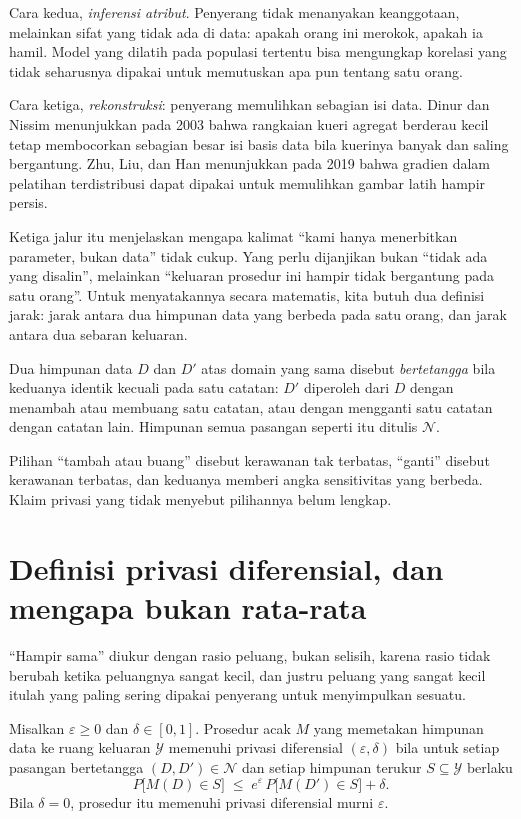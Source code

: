 Cara kedua, \emph{inferensi atribut}. Penyerang tidak menanyakan keanggotaan, melainkan
sifat yang tidak ada di data: apakah orang ini merokok, apakah ia hamil. Model yang
dilatih pada populasi tertentu bisa mengungkap korelasi yang tidak seharusnya dipakai
untuk memutuskan apa pun tentang satu orang.

Cara ketiga, \emph{rekonstruksi}: penyerang memulihkan sebagian isi data. Dinur dan
Nissim menunjukkan pada 2003 bahwa rangkaian kueri agregat berderau kecil tetap
membocorkan sebagian besar isi basis data bila kuerinya banyak dan saling bergantung.
Zhu, Liu, dan Han menunjukkan pada 2019 bahwa gradien dalam pelatihan terdistribusi
dapat dipakai untuk memulihkan gambar latih hampir persis.

Ketiga jalur itu menjelaskan mengapa kalimat ``kami hanya menerbitkan parameter, bukan
data'' tidak cukup. Yang perlu dijanjikan bukan ``tidak ada yang disalin'', melainkan
``keluaran prosedur ini hampir tidak bergantung pada satu orang''. Untuk menyatakannya
secara matematis, kita butuh dua definisi jarak: jarak antara dua himpunan data yang
berbeda pada satu orang, dan jarak antara dua sebaran keluaran.

\begin{definisi}
Dua himpunan data $D$ dan $D'$ atas domain yang sama disebut \emph{bertetangga} bila
keduanya identik kecuali pada satu catatan: $D'$ diperoleh dari $D$ dengan menambah
atau membuang satu catatan, atau dengan mengganti satu catatan dengan catatan lain.
Himpunan semua pasangan seperti itu ditulis $\mathcal{N}$.
\end{definisi}

Pilihan ``tambah atau buang'' disebut kerawanan tak terbatas, ``ganti'' disebut
kerawanan terbatas, dan keduanya memberi angka sensitivitas yang berbeda. Klaim privasi
yang tidak menyebut pilihannya belum lengkap.

\section{Definisi privasi diferensial, dan mengapa bukan rata-rata}

``Hampir sama'' diukur dengan rasio peluang, bukan selisih, karena rasio tidak berubah
ketika peluangnya sangat kecil, dan justru peluang yang sangat kecil itulah yang paling
sering dipakai penyerang untuk menyimpulkan sesuatu.

\begin{definisi}
Misalkan $\varepsilon\ge 0$ dan $\delta\in[0,1]$. Prosedur acak $M$ yang memetakan
himpunan data ke ruang keluaran $\mathcal{Y}$ memenuhi privasi diferensial
$(\varepsilon,\delta)$ bila untuk setiap pasangan bertetangga $(D,D')\in\mathcal{N}$ dan
setiap himpunan terukur $S\subseteq\mathcal{Y}$ berlaku
\begin{equation}
P\bigl[M(D)\in S\bigr] \;\le\; e^{\varepsilon}\,P\bigl[M(D')\in S\bigr] + \delta .
\end{equation}
Bila $\delta=0$, prosedur itu memenuhi privasi diferensial murni $\varepsilon$.
\end{definisi}

